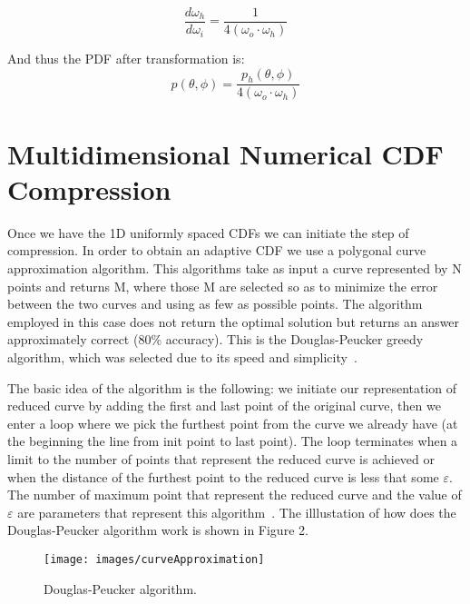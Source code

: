 \documentclass[conference]{acmsiggraph}
\begin{document}
\begin{equation}
\frac{d\omega_{h}}{d\omega_{i}} = \frac{1}{4(\omega_{o}\cdot \omega_{h})}
\end{equation}

And thus the PDF after transformation is:
\begin{equation}
p(\theta, \phi) = \frac{p_{h}(\theta, \phi)}{4(\omega_{o}\cdot \omega_{h})}
\end{equation}

\section{Multidimensional Numerical CDF Compression}
Once we have the 1D uniformly spaced CDFs we can initiate the step of compression. In order to obtain an adaptive CDF we use a polygonal curve approximation algorithm. This algorithms take as input a curve represented by N points and returns M, where those M are selected so as to minimize the error between the two curves and using as few as possible points. The algorithm employed in this case does not return the optimal solution but returns an answer approximately correct (80\% accuracy). This is the Douglas-Peucker greedy algorithm, which was selected due to its speed and simplicity~\cite{Douglas-Peucker:1973:AFT}. 

The basic idea of the algorithm is the following: we initiate our representation of reduced curve by adding the first and last point of the original curve, then we enter a loop where we pick the furthest point from the curve we already have (at the beginning the line from init point to last point). The loop terminates when a limit to the number of points that represent the reduced curve is achieved or when the distance of the furthest point to the reduced curve is less that some $\varepsilon$. The number of maximum point that represent the reduced curve and the value of $\varepsilon$ are parameters that represent this algorithm~\cite{Lawrence:2005:ANC}.  The illlustation of how does the Douglas-Peucker algorithm work is shown in Figure 2.

\begin{figure}[ht]
  \centering
  \texttt{[image: images/curveApproximation]}
  \caption{Douglas-Peucker algorithm.}
\end{figure}
\end{document}
